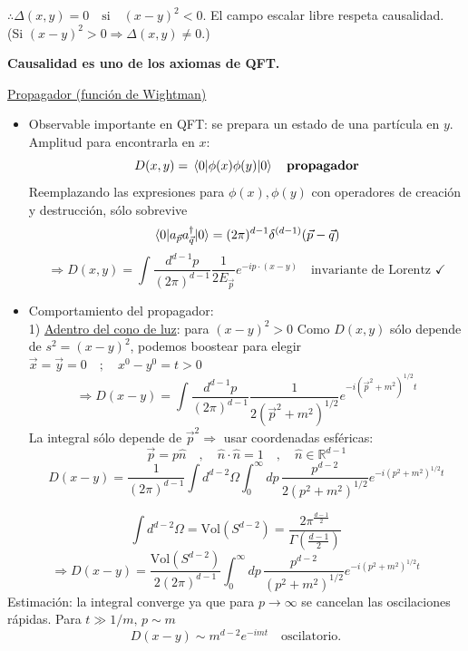 $\therefore \Delta(x,y) = 0 \quad \text{si} \quad (x-y)^2 < 0$. El campo escalar libre respeta causalidad. \\
(Si $(x-y)^2 > 0 \Rightarrow \Delta(x,y) \neq 0$.)

\textbf{Causalidad es uno de los axiomas de QFT.}

\noindent \underline{Propagador (función de Wightman)}
\begin{itemize}
    \item Observable importante en QFT: se prepara un estado de una partícula en $y$. Amplitud para encontrarla en $x$:
          $$ D(x,y) = \matrixel{0}{\phi(x)\phi(y)}{0} \quad \textbf{propagador} $$
          Reemplazando las expresiones para $\phi(x), \phi(y)$ con operadores de creación y destrucción, sólo sobrevive
          $$ \matrixel{0}{a_{\vec{p}} a_{\vec{q}}^\dagger}{0} = (2\pi)^{d-1} \delta^{(d-1)}(\vec{p}-\vec{q}) $$
          $$ \Rightarrow D(x,y) = \int \frac{d^{d-1}p}{(2\pi)^{d-1}} \frac{1}{2E_{\vec{p}}} e^{-i p \cdot (x-y)} \quad \text{invariante de Lorentz } \checkmark $$
    \item Comportamiento del propagador: \\
          1) \underline{Adentro del cono de luz}: para $(x-y)^2 > 0$ Como $D(x,y)$ sólo depende de $s^2 = (x-y)^2$, podemos boostear para elegir $\vec{x} = \vec{y} = 0 \quad ; \quad x^0 - y^0 = t > 0$
          $$ \Rightarrow D(x-y) = \int \frac{d^{d-1}p}{(2\pi)^{d-1}} \frac{1}{2(\vec{p}^2 + m^2)^{1/2}} e^{-i (\vec{p}^2 + m^2)^{1/2} t} $$
          La integral sólo depende de $\vec{p}^2 \Rightarrow$ usar coordenadas esféricas:
          $$ \vec{p} = p\hat{n} \quad , \quad \hat{n} \cdot \hat{n} = 1 \quad , \quad \hat n \in \mathbb{R}^{d-1}$$
          $$ D(x-y) = \frac{1}{(2\pi)^{d-1}} \int d^{d-2}\Omega \int_0^\infty dp \, \frac{p^{d-2}}{2(p^2 + m^2)^{1/2}} e^{-i(p^2 + m^2)^{1/2}t} $$
\end{itemize}

$$ \int d^{d-2}\Omega = \text{Vol}(S^{d-2}) = \frac{2\pi^{\frac{d-1}{2}}}{\Gamma(\frac{d-1}{2})} $$
$$ \Rightarrow D(x-y) = \frac{\text{Vol}(S^{d-2})}{2(2\pi)^{d-1}} \int_0^\infty dp \, \frac{p^{d-2}}{(p^2 + m^2)^{1/2}} e^{-i(p^2 + m^2)^{1/2}t} $$
Estimación: la integral converge ya que para $p \rightarrow \infty$ se cancelan las oscilaciones rápidas. Para $t \gg 1/m,\, p \sim m$
$$ D(x-y) \sim m^{d-2} e^{-imt} \quad \text{oscilatorio.} $$

